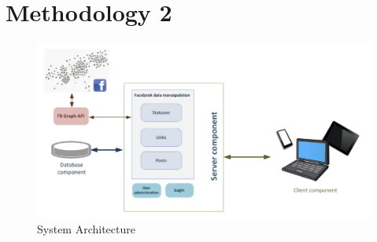\chapter{Methodology 2}

\begin{figure}[htb]
    \centering
    \includegraphics[width=1\textwidth]{Figures/rrl_system-architecture.png}
    \caption{System Architecture}
    \label{fig:rrl_system-architecture}
\end{figure}